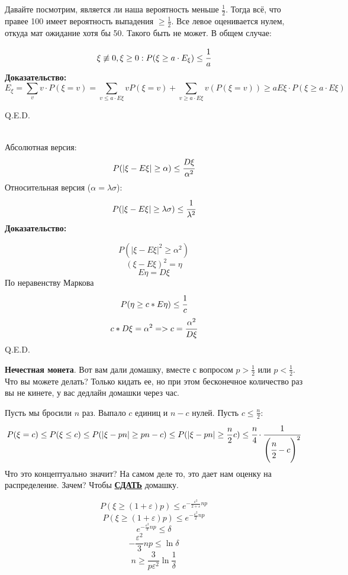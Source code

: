 Давайте посмотрим, является ли наша вероятность меньше $\frac 1 2$. Тогда всё, что правее 100 имеет вероятность выпадения $\geq \frac1 2 $. Все левое оценивается нулем, откуда мат ожидание хотя бы 50. Такого быть не может. В общем случае:

$$\xi\not \equiv0,\xi\geq 0: P(\xi\geq a \cdot E_{\xi}) \leq \cfrac{1}{a}$$
\textbf{Доказательство:}
$$E_{\xi} = \sum\limits_{v}v \cdot P(\xi = v) = \sum\limits_{v \le a \cdot E\xi} v P(\xi = v)+ \sum\limits_{v\geq a\cdot E\xi} v (P(\xi=v))\geq a E{\xi}\cdot P (\xi\geq a\cdot E{\xi})$$

\hfill Q.E.D.

 \\
Абсолютная версия:
$$P(|\xi-E\xi|\geq \alpha)\leq \cfrac{D\xi}{\alpha^2}$$
Относительная версия ($\alpha = \lambda\sigma$):
$$P(|\xi-E\xi|\geq \lambda\sigma)\leq \cfrac{1}{\lambda^2}$$
\textbf{Доказательство:}

$$P(|\xi-E\xi|^2\geq\alpha^2)$$
$$(\xi-E\xi)^2=\eta$$
$$E\eta=D\xi$$
По неравенству Маркова
$$P(\eta\geq c*E\eta)\leq \cfrac{1}{c}$$
$$c * D\xi=\alpha^2 => c=\cfrac{\alpha^2}{D\xi}$$
\hfill Q.E.D.

\textbf{Нечестная монета}. Вот вам дали домашку, вместе  с вопросом $p>\frac{1}{2}$ или $p<\frac{1}{2}$. Что вы можете делать? Только кидать ее, но при этом бесконечное количество раз вы не кинете, у вас дедлайн домашки через час. 

Пусть мы бросили $n$ раз. Выпало $c$ единиц и $n-c$ нулей. Пусть $c\le \frac{n}{2}$:
$$P(\xi = c)\leq P(\xi\leq c)\leq P(|\xi-pn|\geq pn-c)\leq  P(|\xi-pn|\geq \frac n 2 c)\leq \cfrac{n}{4}\cdot \cfrac{1}{\left(\cfrac{n}{2}-c\right)^2}$$
Что это концептуально значит? На самом деле то, это дает нам оценку на распределение. Зачем? Чтобы \textbf{\uline{СДАТЬ}} домашку.

$$P(\xi\geq (1+\varepsilon)p)\leq e^{-\frac{\varepsilon^2}{2+\varepsilon}np}$$
$$P(\xi\geq (1+\varepsilon)p)\leq e^{-\frac{\varepsilon^2}{2}np}$$
$$e^{-\frac{\varepsilon^2}{3}np}\leq \delta$$
$$-\dfrac{\varepsilon^2}{3}np\leq \ln{\delta}$$
$$n\geq \frac{3}{p\varepsilon^2}\ln{\frac{1}{\delta}}$$
